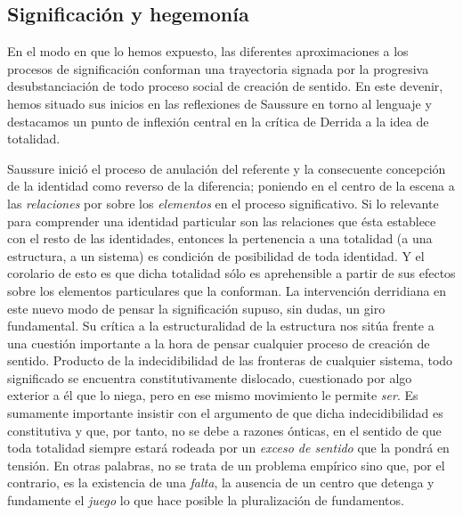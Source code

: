 \documentclass{book}
\begin{document}
\hypertarget{significaciuxf3n-y-hegemonuxeda}{%
\subsection{Significación y hegemonía}\label{significaciuxf3n-y-hegemonuxeda}}

En el modo en que lo hemos expuesto, las diferentes aproximaciones a los
procesos de significación conforman una trayectoria signada por la
progresiva desubstanciación de todo proceso social de creación de
sentido. En este devenir, hemos situado sus inicios en las reflexiones
de Saussure en torno al lenguaje y destacamos un punto de inflexión
central en la crítica de Derrida a la idea de totalidad.

Saussure inició el proceso de anulación del referente y la consecuente
concepción de la identidad como reverso de la diferencia; poniendo en el
centro de la escena a las \emph{relaciones} por sobre los
\emph{elementos} en el proceso significativo. Si lo relevante para
comprender una identidad particular son las relaciones que ésta
establece con el resto de las identidades, entonces la pertenencia a una
totalidad (a una estructura, a un sistema) es condición de posibilidad
de toda identidad. Y el corolario de esto es que dicha totalidad sólo es
aprehensible a partir de sus efectos sobre los elementos particulares
que la conforman. La intervención derridiana en este nuevo modo de
pensar la significación supuso, sin dudas, un giro fundamental. Su
crítica a la estructuralidad de la estructura nos sitúa frente a una
cuestión importante a la hora de pensar cualquier proceso de creación de
sentido. Producto de la indecidibilidad de las fronteras de cualquier
sistema, todo significado se encuentra constitutivamente dislocado,
cuestionado por algo exterior a él que lo niega, pero en ese mismo
movimiento le permite \emph{ser}. Es sumamente importante insistir con
el argumento de que dicha indecidibilidad es constitutiva y que, por
tanto, no se debe a razones ónticas, en el sentido de que toda totalidad
siempre estará rodeada por un \emph{exceso de sentido} que la pondrá en
tensión. En otras palabras, no se trata de un problema empírico sino
que, por el contrario, es la existencia de una \emph{falta}, la ausencia
de un centro que detenga y fundamente el \emph{juego} lo que hace
posible la pluralización de fundamentos.
\end{document}
